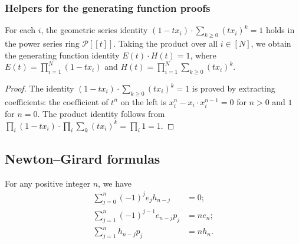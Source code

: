\subsubsection{Helpers for the generating function proofs}

\begin{lemma}
\label{lem.sf.geom-series}
\leanhelper
\leanok
For each $i$, the geometric series identity
$(1 - t x_i) \cdot \sum_{k \geq 0} (t x_i)^k = 1$
holds in the power series ring $\mathcal{P}[[t]]$.
Taking the product over all $i \in [N]$, we obtain the generating function identity
$E(t) \cdot H(t) = 1$, where
$E(t) = \prod_{i=1}^N (1 - t x_i)$ and
$H(t) = \prod_{i=1}^N \sum_{k \geq 0} (t x_i)^k$.
\end{lemma}

\begin{proof}
The identity $(1 - t x_i) \cdot \sum_{k \geq 0} (t x_i)^k = 1$ is proved by extracting
coefficients: the coefficient of $t^n$ on the left is $x_i^n - x_i \cdot x_i^{n-1} = 0$ for $n > 0$
and $1$ for $n = 0$. The product identity follows from
$\prod_i (1 - t x_i) \cdot \prod_i \sum_k (t x_i)^k = \prod_i 1 = 1$.
\end{proof}

\subsection{Newton--Girard formulas}

\begin{theorem}
\label{thm.sf.NG}
\leantarget
\leanok
For any positive integer $n$, we have
\begin{align}
\sum_{j=0}^{n} (-1)^j e_j h_{n-j} &= 0; \label{eq.thm.sf.NG.eh} \\
\sum_{j=1}^{n} (-1)^{j-1} e_{n-j} p_j &= n e_n; \label{eq.thm.sf.NG.ep} \\
\sum_{j=1}^{n} h_{n-j} p_j &= n h_n. \label{eq.thm.sf.NG.hp}
\end{align}
\end{theorem}

